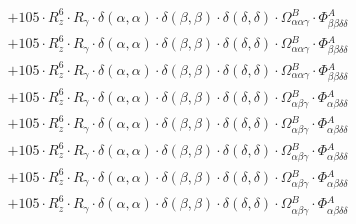 \documentclass{article}
\begin{document}
\begin{subequations}
\begin{gather}
\begin{array}{c}
 \\[0.2em] 		 + 105 \cdot R_{z}^{6} \cdot R_{\gamma{}} \cdot \delta{}\left(\alpha{}, \alpha{}\right) \cdot \delta{}\left(\beta{}, \beta{}\right) \cdot \delta{}\left(\delta{}, \delta{}\right) \cdot \Omega{}^{B}_{\alpha{}\alpha{}\gamma{}} \cdot \Phi{}^{A}_{\beta{}\beta{}\delta{}\delta{}} 
 \\[0.2em] 		 + 105 \cdot R_{z}^{6} \cdot R_{\gamma{}} \cdot \delta{}\left(\alpha{}, \alpha{}\right) \cdot \delta{}\left(\beta{}, \beta{}\right) \cdot \delta{}\left(\delta{}, \delta{}\right) \cdot \Omega{}^{B}_{\alpha{}\alpha{}\gamma{}} \cdot \Phi{}^{A}_{\beta{}\beta{}\delta{}\delta{}} 
 \\[0.2em] 		 + 105 \cdot R_{z}^{6} \cdot R_{\gamma{}} \cdot \delta{}\left(\alpha{}, \alpha{}\right) \cdot \delta{}\left(\beta{}, \beta{}\right) \cdot \delta{}\left(\delta{}, \delta{}\right) \cdot \Omega{}^{B}_{\alpha{}\alpha{}\gamma{}} \cdot \Phi{}^{A}_{\beta{}\beta{}\delta{}\delta{}} 
 \\[0.2em] 		 + 105 \cdot R_{z}^{6} \cdot R_{\gamma{}} \cdot \delta{}\left(\alpha{}, \alpha{}\right) \cdot \delta{}\left(\beta{}, \beta{}\right) \cdot \delta{}\left(\delta{}, \delta{}\right) \cdot \Omega{}^{B}_{\alpha{}\beta{}\gamma{}} \cdot \Phi{}^{A}_{\alpha{}\beta{}\delta{}\delta{}} 
 \\[0.2em] 		 + 105 \cdot R_{z}^{6} \cdot R_{\gamma{}} \cdot \delta{}\left(\alpha{}, \alpha{}\right) \cdot \delta{}\left(\beta{}, \beta{}\right) \cdot \delta{}\left(\delta{}, \delta{}\right) \cdot \Omega{}^{B}_{\alpha{}\beta{}\gamma{}} \cdot \Phi{}^{A}_{\alpha{}\beta{}\delta{}\delta{}} 
 \\[0.2em] 		 + 105 \cdot R_{z}^{6} \cdot R_{\gamma{}} \cdot \delta{}\left(\alpha{}, \alpha{}\right) \cdot \delta{}\left(\beta{}, \beta{}\right) \cdot \delta{}\left(\delta{}, \delta{}\right) \cdot \Omega{}^{B}_{\alpha{}\beta{}\gamma{}} \cdot \Phi{}^{A}_{\alpha{}\beta{}\delta{}\delta{}} 
 \\[0.2em] 		 + 105 \cdot R_{z}^{6} \cdot R_{\gamma{}} \cdot \delta{}\left(\alpha{}, \alpha{}\right) \cdot \delta{}\left(\beta{}, \beta{}\right) \cdot \delta{}\left(\delta{}, \delta{}\right) \cdot \Omega{}^{B}_{\alpha{}\beta{}\gamma{}} \cdot \Phi{}^{A}_{\alpha{}\beta{}\delta{}\delta{}} 
 \\[0.2em] 		 + 105 \cdot R_{z}^{6} \cdot R_{\gamma{}} \cdot \delta{}\left(\alpha{}, \alpha{}\right) \cdot \delta{}\left(\beta{}, \beta{}\right) \cdot \delta{}\left(\delta{}, \delta{}\right) \cdot \Omega{}^{B}_{\alpha{}\beta{}\gamma{}} \cdot \Phi{}^{A}_{\alpha{}\beta{}\delta{}\delta{}} 

\end{array}
\end{gather}
\end{subequations}
\end{document}
